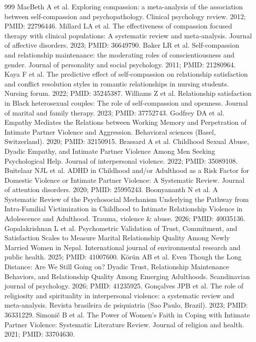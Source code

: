 \begin{thebibliography}{999}
 MacBeth A et al. Exploring compassion: a meta-analysis of the association between self-compassion and psychopathology. Clinical psychology review. 2012; PMID: 22796446.
 Millard LA et al. The effectiveness of compassion focused therapy with clinical populations: A systematic review and meta-analysis. Journal of affective disorders. 2023; PMID: 36649790.
 Baker LR et al. Self-compassion and relationship maintenance: the moderating roles of conscientiousness and gender. Journal of personality and social psychology. 2011; PMID: 21280964.
 Kaya F et al. The predictive effect of self-compassion on relationship satisfaction and conflict resolution styles in romantic relationships in nursing students. Nursing forum. 2022; PMID: 35245387.
 Williams Z et al. Relationship satisfaction in Black heterosexual couples: The role of self-compassion and openness. Journal of marital and family therapy. 2023; PMID: 37752743.
 Godfrey DA et al. Empathy Mediates the Relations between Working Memory and Perpetration of Intimate Partner Violence and Aggression. Behavioral sciences (Basel, Switzerland). 2020; PMID: 32150915.
 Brassard A et al. Childhood Sexual Abuse, Dyadic Empathy, and Intimate Partner Violence Among Men Seeking Psychological Help. Journal of interpersonal violence. 2022; PMID: 35089108.
 Buitelaar NJL et al. ADHD in Childhood and/or Adulthood as a Risk Factor for Domestic Violence or Intimate Partner Violence: A Systematic Review. Journal of attention disorders. 2020; PMID: 25995243.
 Boonyananth N et al. A Systematic Review of the Psychosocial Mechanism Underlying the Pathway from Intra-Familial Victimization in Childhood to Intimate Relationship Violence in Adolescence and Adulthood. Trauma, violence \& abuse. 2026; PMID: 40035136.
 Gopalakrishnan L et al. Psychometric Validation of Trust, Commitment, and Satisfaction Scales to Measure Marital Relationship Quality Among Newly Married Women in Nepal. International journal of environmental research and public health. 2025; PMID: 41007600.
 Körün AB et al. Even Though the Long Distance: Are We Still Going on? Dyadic Trust, Relationship Maintenance Behaviors, and Relationship Quality Among Emerging Adulthoods. Scandinavian journal of psychology. 2026; PMID: 41235925.
 Gonçalves JPB et al. The role of religiosity and spirituality in interpersonal violence: a systematic review and meta-analysis. Revista brasileira de psiquiatria (Sao Paulo, Brazil). 2023; PMID: 36331229.
 Simonič B et al. The Power of Women's Faith in Coping with Intimate Partner Violence: Systematic Literature Review. Journal of religion and health. 2021; PMID: 33704630.


\end{thebibliography}
